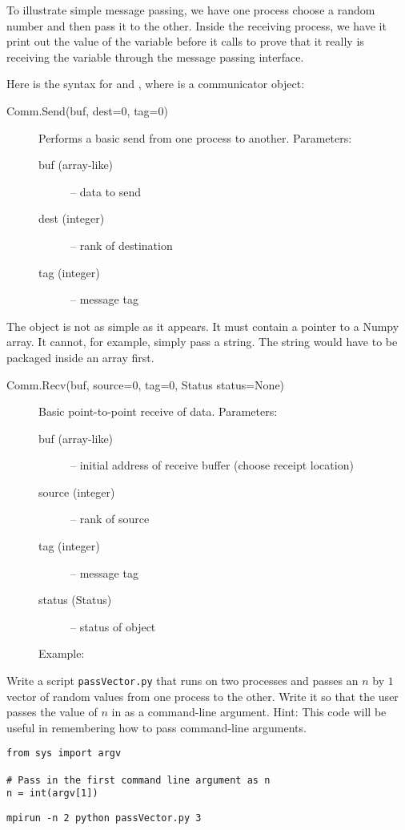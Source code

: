 

To illustrate simple message passing, we have one process choose a random number and then pass it to the other. 
Inside the receiving process, we have it print out the value of the variable  before it calls  to prove that it really is receiving the variable through the message passing interface.

Here is the syntax for  and , where  is a communicator object:

\begin{description}
\item[Comm.Send(buf, dest=0, tag=0)]
Performs a basic send from one process to another.
Parameters:
\begin{description}
\item[buf (array-like)] – data to send
\item[dest (integer)] – rank of destination
\item[tag (integer)] – message tag
\end{description}
\end{description}

The  object is not as simple as it appears. It must contain a pointer to a Numpy array. It cannot, for example, simply pass a string. 
The string would have to be packaged inside an array first.

\begin{description}
\item[Comm.Recv(buf, source=0, tag=0, Status status=None)]
Basic point-to-point receive of data.
Parameters:
\begin{description}
\item[buf (array-like)] – initial address of receive buffer (choose receipt location)
\item[source (integer)] – rank of source
\item[tag (integer)] – message tag
\item[status (Status)] – status of object
\end{description}
Example:

\end{description}

\begin{problem}
Write a script \texttt{passVector.py} that runs on two processes and passes an $n$ by $1$ vector of random values from one process to the other. 
Write it so that the user passes the value of $n$ in as a command-line argument.
Hint: This code will be useful in remembering how to pass command-line arguments.
\begin{lstlisting}
from sys import argv

# Pass in the first command line argument as n
n = int(argv[1])
\end{lstlisting}
\begin{lstlisting}
mpirun -n 2 python passVector.py 3
\end{lstlisting}
\end{problem}

